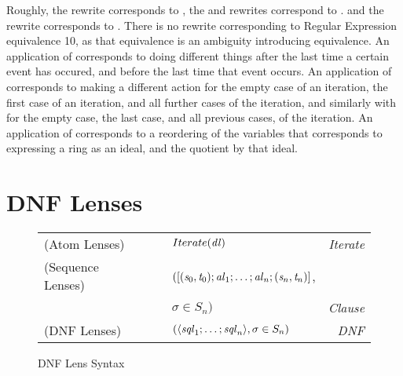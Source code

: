 Roughly, the \AtomSumstarRule{} rewrite corresponds to \SumstarRule{},
the \AtomUnrollstarLeftRule{} and \AtomUnrollstarRightRule{} rewrites correspond to \ProductstarRule{}.
and the \DicyclicRewriteStarRule{} rewrite corresponds to \DicyclicityRule{}.
There is no rewrite corresponding to Regular Expression equivalence 10, as that
equivalence is an ambiguity introducing equivalence.
An application of \AtomSumstarRule{} corresponds to doing different things after the last time a certain event has occured, and before the last time that event occurs.
An application of \AtomUnrollstarLeftRule{} corresponds to making a different action for
the empty case of an iteration, the first case of an iteration, and all further cases of the iteration,
and similarly with \AtomUnrollstarRightRule{} for the empty case, the last case, and all previous cases, of the iteration.
An application of \DicyclicRewriteStarRule{} corresponds to a reordering of the
variables that corresponds to expressing a ring as an ideal, and the quotient by
that ideal.

\section{DNF Lenses}

\begin{figure}
\centering
\begin{tabular}{@{}l@{\ }l@{\ }c@{}l@{\ }>{\itshape\/}r@{}}
(Atom Lenses) &\AtomLens{} & \GEq{} & $Iterate(\mathit{dl})$ & Iterate\\
(Sequence Lenses) &\SequenceLens{} & \GEq{} &
$([(\mathit{s}_0,\mathit{t}_0);\mathit{al}_1;\ldots;\mathit{al}_n;(\mathit{s}_n,\mathit{t}_n)]$, &\\
& & & $\sigma \in S_n)$ & Clause\SubN{}\\
(DNF Lenses)& \DNFLens{} & \GEq{} & $(\langle\mathit{sql}_1;\ldots;\mathit{sql}_n\rangle, \sigma \in S_n)$ & DNF\SubN{}\\
\end{tabular}
\caption{DNF Lens Syntax}
\label{fig:dnf-lens-syntax}
\end{figure}

